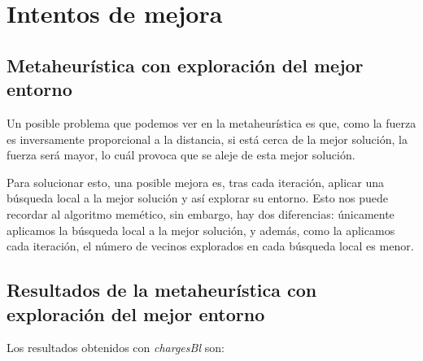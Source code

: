 \documentclass[11pt,a4paper]{article}
\begin{document}
\newpage
\section{Intentos de mejora}

\subsection{Metaheurística con exploración del mejor entorno}

Un posible problema que podemos ver en la metaheurística es que, como la fuerza es inversamente proporcional a la distancia, si está cerca de la mejor solución, la fuerza será mayor, lo cuál provoca que se aleje de esta mejor solución.

Para solucionar esto, una posible mejora es, tras cada iteración, aplicar una búsqueda local a la mejor solución y así explorar su entorno. Esto nos puede recordar al algoritmo memético, sin embargo, hay dos diferencias: únicamente aplicamos la búsqueda local a la mejor solución, y además, como la aplicamos cada iteración, el número de vecinos explorados en cada búsqueda local es menor.

\subsection{Resultados de la metaheurística con exploración del mejor entorno}

Los resultados obtenidos con \emph{chargesBl} son:
\end{document}
